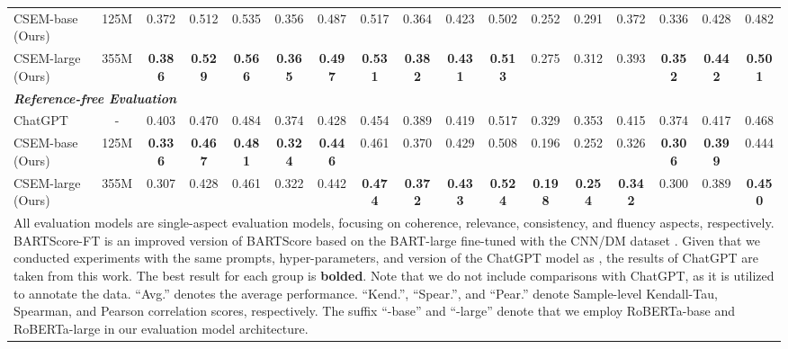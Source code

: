 \begin{table*}[]
{\begin{tabular}{lcccccccccccccccc}
    CSEM-base (Ours)    & 125M &0.372 & 0.512  & 0.535 & 0.356 & 0.487  & 0.517 & 0.364 & 0.423  & 0.502 & 0.252 & 0.291  & 0.372 & 0.336 & 0.428 & 0.482      \\
    CSEM-large (Ours)   & 355M&\bf0.386 & \bf0.529  & \bf0.566 & \bf0.365 & \bf0.497  & \bf0.531 & \bf0.382 & \bf0.431  &\bf0.513 & 0.275 & 0.312  & 0.393 & \bf0.352 & \bf0.442 & \bf0.501     \\ \midrule
    \multicolumn{17}{l}{\textit{\textbf{Reference-free Evaluation}}} \\ \midrule
    ChatGPT                  & -   &0.403 & 0.470 & 0.484 & 0.374 & 0.428  & 0.454 & 0.389 & 0.419  & 0.517 & 0.329 & 0.353 & 0.415 & 0.374 & 0.417 & 0.468    \\  \hdashline
    CSEM-base (Ours)    & 125M&\bf{0.336} & \bf{0.467} & \bf{0.481} & \bf{0.324} & \bf{0.446}  & 0.461 & 0.370 & 0.429  & 0.508 & 0.196 & 0.252 & 0.326 & \bf{0.306} & \bf{0.399} & 0.444   \\
    CSEM-large (Ours)         & 355M &0.307 & 0.428 & 0.461 & 0.322 & 0.442  & \bf0.474 & \bf{0.372} & \bf0.433  & \bf0.524 & \bf{0.198} & \bf{0.254} & \bf{0.342} & 0.300 & 0.389 & \bf{0.450}  \\ 
    \toprule[1.1pt]
    \multicolumn{17}{l}{\parbox{20cm}{All evaluation models are single-aspect evaluation models, focusing on coherence, relevance, consistency, and fluency aspects, respectively. BARTScore-FT is an improved version of BARTScore based on the BART-large fine-tuned with the CNN/DM dataset \cite{yuan2021bartscore}. Given that we conducted experiments with the same prompts, hyper-parameters, and version of the ChatGPT model as \cite{wang2023chatgpt}, the results of ChatGPT are taken from this work. 
    The best result for each group is \textbf{bolded}. Note that we do not include comparisons with ChatGPT, as it is utilized to annotate the data.
    “Avg.” denotes the average performance.
    “Kend.”, “Spear.”, and “Pear.” denote Sample-level Kendall-Tau, Spearman, and Pearson correlation scores, respectively.
    The suffix “-base” and “-large” denote that we employ RoBERTa-base and RoBERTa-large in our evaluation model architecture.}} \\
    \end{tabular}
    }
\end{table*}